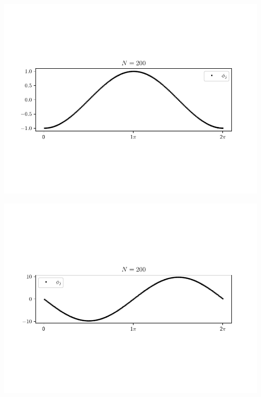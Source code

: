 \begin{Figure}
    \centering
    \captionsetup{type = figure}
    \includegraphics[width = \textwidth]{phi1_a10_b1_N200.pdf}
    \label{fig:phi1_a10_b1_N200}
\end{Figure}
\begin{Figure}
    \centering
    \captionsetup{type = figure}
    \includegraphics[width = \textwidth]{phi2_a10_b1_N200.pdf}
    \label{fig:phi2_a10_b1_N200}
\end{Figure}
